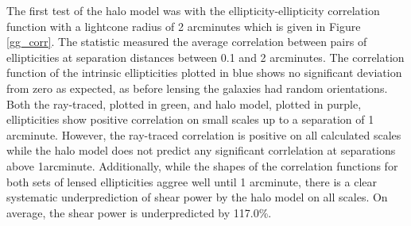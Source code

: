 \documentclass[%
 reprint,
 amsmath,amssymb,
 aps,nofootinbib
]{revtex4-1}
\begin{document}
The first test of the halo model was with the ellipticity-ellipticity correlation function with a lightcone radius of 2 arcminutes which is given in Figure \ref{gg_corr}. The statistic measured the average correlation between pairs of ellipticities at separation distances between 0.1 and 2 arcminutes. The correlation function of the intrinsic ellipticities plotted in blue shows no significant deviation from zero as expected, as before lensing the galaxies had random orientations. Both the ray-traced, plotted in green, and halo model, plotted in purple, ellipticities show positive correlation on small scales up to a separation of 1 arcminute. However, the ray-traced correlation is positive on all calculated scales while the halo model does not predict any significant corrlelation at separations above 1arcminute. Additionally, while the shapes of the correlation functions for both sets of lensed ellipticities aggree well until 1 arcminute, there is a clear systematic underprediction of shear power by the halo model on all scales. On average, the shear power is underpredicted by 117.0\%.
\end{document}
